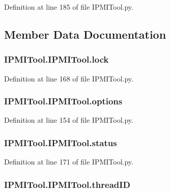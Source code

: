 Definition at line 185 of file I\-P\-M\-I\-Tool.\-py.



\subsection{Member Data Documentation}
\hypertarget{class_i_p_m_i_tool_1_1_i_p_m_i_tool_a36a9429fca7200e0a6d1d78002b95d11}{
\subsubsection[{lock}]{\setlength{\rightskip}{0pt plus 5cm}I\-P\-M\-I\-Tool.\-I\-P\-M\-I\-Tool.\-lock}}\label{class_i_p_m_i_tool_1_1_i_p_m_i_tool_a36a9429fca7200e0a6d1d78002b95d11}


Definition at line 168 of file I\-P\-M\-I\-Tool.\-py.

\hypertarget{class_i_p_m_i_tool_1_1_i_p_m_i_tool_a9f0f9484b1b8f6a0df8338f7894c8823}{
\subsubsection[{options}]{\setlength{\rightskip}{0pt plus 5cm}I\-P\-M\-I\-Tool.\-I\-P\-M\-I\-Tool.\-options}}\label{class_i_p_m_i_tool_1_1_i_p_m_i_tool_a9f0f9484b1b8f6a0df8338f7894c8823}


Definition at line 154 of file I\-P\-M\-I\-Tool.\-py.

\hypertarget{class_i_p_m_i_tool_1_1_i_p_m_i_tool_a4dba85133ceca9edff481c575cb468d9}{
\subsubsection[{status}]{\setlength{\rightskip}{0pt plus 5cm}I\-P\-M\-I\-Tool.\-I\-P\-M\-I\-Tool.\-status}}\label{class_i_p_m_i_tool_1_1_i_p_m_i_tool_a4dba85133ceca9edff481c575cb468d9}


Definition at line 171 of file I\-P\-M\-I\-Tool.\-py.

\hypertarget{class_i_p_m_i_tool_1_1_i_p_m_i_tool_aaa15d2dc90d9e3a45adc4519912c811d}{
\subsubsection[{thread\-I\-D}]{\setlength{\rightskip}{0pt plus 5cm}I\-P\-M\-I\-Tool.\-I\-P\-M\-I\-Tool.\-thread\-I\-D}}\label{class_i_p_m_i_tool_1_1_i_p_m_i_tool_aaa15d2dc90d9e3a45adc4519912c811d}


